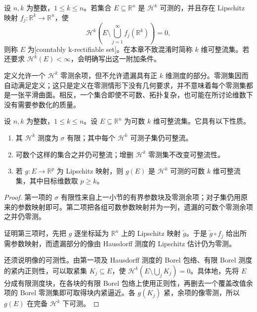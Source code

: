 \begin{definition}\label{b1:def:countably-rectifiable-set}
设 \(n,k\) 为整数，\(1\leq k\leq n\)。若集合 \(E\subseteq\mathbb R^n\) 是 \(\mathcal H^k\) 可测的，并且存在 Lipschitz 映射 \(f_j:\mathbb R^k\to\mathbb R^n\)，使
\[
 \mathcal H^k\left(E\setminus\bigcup_{j=1}^{\infty}f_j(\mathbb R^k)\right)=0,
\]
则称 \(E\) 为[countably k-rectifiable set]。在本章不致混淆时简称 \(k\) 维可整流集。若还要求 \(\mathcal H^k(E)<\infty\)，会明确写出这一附加条件。
\end{definition}

定义允许一个 \(\mathcal H^k\) 零测余项，但不允许遗漏具有正 \(k\) 维测度的部分。零测集因而自动满足定义；这只是定义在零测情形下没有几何要求，并不意味着每个零测集都是一张平滑曲面。相反，一个集合即使不可数、拓扑复杂，也可能在所讨论维数下没有需要参数化的质量。

\begin{proposition}\label{b1:prop:rectifiable-basic-properties}
设 \(n,k\) 为整数，\(1\leq k\leq n\)。设 \(E\subseteq\mathbb R^n\) 为可数 \(k\) 维可整流集。它具有以下性质。
\begin{enumerate}
\item\label{b1:item:rectifiable-sigma-finite}其 \(\mathcal H^k\) 测度为 \(\sigma\) 有限；其中每个 \(\mathcal H^k\) 可测子集仍可整流。
\item\label{b1:item:rectifiable-countable-union}可数个这样的集合之并仍可整流；增删 \(\mathcal H^k\) 零测集不改变可整流性。
\item\label{b1:item:rectifiable-lipschitz-image}若 \(g:E\to\mathbb R^p\) 为 Lipschitz 映射，则 \(g(E)\) 是 \(\mathcal H^k\) 可测的可数 \(k\) 维可整流集，其中目标维数取 \(p\geq k\)。
\end{enumerate}
\end{proposition}
\begin{proof}
第一项的 \(\sigma\) 有限性来自上一小节的有界参数块及零测余项；对子集仍用原来的参数映射即可。第二项把各组可数参数映射并为一列，遗漏的可数个零测余项之并仍零测。

证明第三项时，先把 \(g\) 逐坐标延为 \(\mathbb R^n\) 上的 Lipschitz 映射 \(\widetilde g\)。于是 \(\widetilde g\circ f_j\) 给出所需参数映射，而遗漏部分的像由 Hausdorff 测度的 Lipschitz 估计仍为零测。

还须说明像的可测性。由第一项及 Hausdorff 测度的 Borel 包络、有限 Borel 测度的紧内正则性，可以取紧集 \(K_j\subseteq E\)，使 \(\mathcal H^k(E\setminus\bigcup_jK_j)=0\)。具体地，先将 \(E\) 分成有限测度块，在各块的有限 Borel 包络上使用正则性，再删去一个覆盖改值余项的 Borel 零测集即可取得块内紧逼近。各 \(g(K_j)\) 紧，余项的像零测，所以 \(g(E)\) 在完备 \(\mathcal H^k\) 下可测。
\end{proof}

